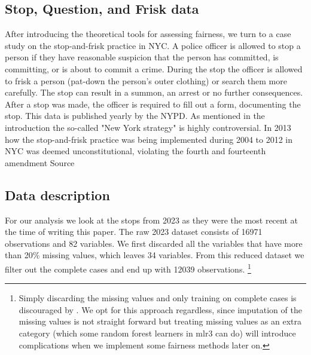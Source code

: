 \subsection*{Stop, Question, and Frisk data}
After introducing the theoretical tools for assessing fairness, we turn to a case study on the stop-and-frisk practice in NYC. A police officer is allowed to stop a person if they have reasonable suspicion that the person has committed, is committing, or is about to commit a crime.
During the stop the officer is allowed to frisk a person (pat-down the person's outer clothing) or search them more carefully.
The stop can result in a summon, an arrest or no further consequences. After a stop was made, the officer is required to fill out a form, documenting the stop. This data is published yearly by the NYPD.
As mentioned in the introduction the so-called "New York strategy" \cite{gelman2007} is highly controversial. In 2013 how the stop-and-frisk practice was being implemented during 2004 to 2012 in NYC was deemed unconstitutional, violating the fourth and fourteenth amendment {\color{red} Source}

\subsection{Data description}
For our analysis we look at the stops from 2023 as they were the most recent at the time of writing this paper. The raw 2023 dataset consists of 16971 observations and 82 variables. We first discarded all the variables that have more than 20\% missing values, which leaves 34 variables.
From this reduced dataset we filter out the complete cases and end up with 12039 observations. \footnote{Simply discarding the missing values and only training on complete cases is discouraged by \cite{fernando2021}. We opt for this approach regardless, since imputation of the missing values is not straight forward
but treating missing values as an extra category (which some random forest learners in mlr3 can do) will introduce complications when we implement some fairness methods later on.}


